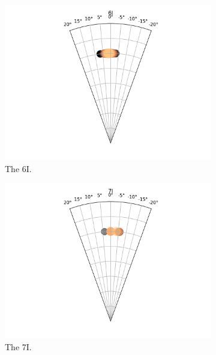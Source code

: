 \documentclass{kththesis}
\begin{document}
\begin{figure}
    \centering
    \begin{subfigure}{0.4\textwidth}
    \centering
    \includegraphics[width=\textwidth]{AgentDirectionChoices/MPDQN_Ullna_Direction_Choices_6I.png} 
    \caption{The 6I.}
    \label{fig:6I_ullna_deviation}
    \end{subfigure}
    \begin{subfigure}{0.4\textwidth}
    \centering
    \includegraphics[width=\textwidth]{AgentDirectionChoices/MPDQN_Ullna_Direction_Choices_7I.png} 
    \caption{The 7I.}
    \label{fig:7I_ullna_deviation}
    \end{subfigure}
    \begin{subfigure}{0.4\textwidth}

\end{subfigure}
\end{figure}
\end{document}
